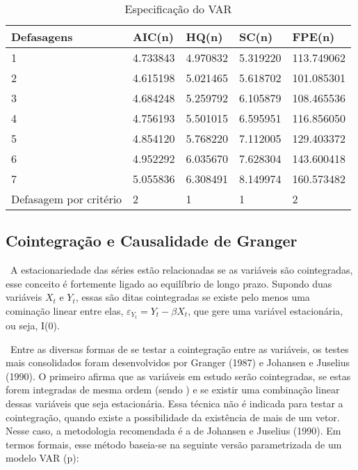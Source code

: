 \documentclass[a4paper,12pt,oneside,titlepage]{article}
\begin{document}
\begin{table}[H]
	\caption{Especificação do VAR}
	\label{selectvar1}
	\begin{center}
		\begin{tabular}{lllll}
			\hline
			Defasagens & AIC(n)  & HQ(n) & SC(n) & FPE(n)\\ 
			\hline
			1 &   4.733843  & 4.970832 & 5.319220 &113.749062 \\ 
			2 & 4.615198  &   5.021465    & 5.618702 &101.085301\\ 
			3 & 4.684248  & 5.259792    & 6.105879 & 108.465536\\ 
			4 &  4.756193  &  5.501015  & 6.595951 &116.856050\\ 
			5 &  4.854120   &  5.768220 &  7.112005 & 129.403372\\ 
			6 & 4.952292   &   6.035670 &   7.628304 & 143.600418\\
			7 & 5.055836   &  6.308491 &   8.149974 & 160.573482\\		
			\hline
			Defasagem por critério & 2  &  1 & 1  & 2\\
			\hline
		\end{tabular}
	\end{center}
\end{table} 

\subsection{Cointegração e Causalidade de Granger}

\ A estacionariedade das séries estão relacionadas se as variáveis são cointegradas, esse conceito é fortemente ligado ao equilíbrio de longo prazo. Supondo duas variáveis $X_t$ e $Y_t$, essas são ditas cointegradas se existe pelo menos uma cominação linear entre elas, $\varepsilon_{Y_t} = Y_t - \beta X_t$, que gere uma variável estacionária, ou seja, I(0). 

\ Entre as diversas formas de se testar a cointegração entre as variáveis, os testes mais consolidados foram desenvolvidos por 
Granger (1987) e Johansen e Juselius (1990). O primeiro afirma que as variáveis em estudo serão cointegradas, se estas forem integradas de mesma ordem
(sendo ) e se existir uma combinação linear dessas variáveis que seja estacionária.
Essa técnica não é indicada para testar a cointegração, quando existe a possibilidade da
existência de mais de um vetor. Nesse caso, a metodologia recomendada é a de
Johansen e Juselius (1990). Em termos formais, esse método baseia-se na seguinte
versão parametrizada de um modelo VAR (p):
\end{document}
